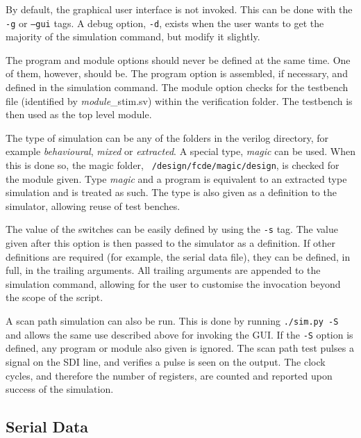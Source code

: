 By default, the graphical user interface is not invoked. 
This can be done with the \texttt{-g} or \texttt{--gui} tags. 
A debug option, \texttt{-d}, exists when the user wants to get the majority of the simulation command, but modify it slightly. 

The program and module options should never be defined at the same time. 
One of them, however, should be. 
The program option is assembled, if necessary, and defined in the simulation command. 
The module option checks for the testbench file (identified by \textit{module}\_stim.sv) within the verification folder. 
The testbench is then used as the top level module. 

The type of simulation can be any of the folders in the verilog directory, for example \textit{behavioural}, \textit{mixed} or \textit{extracted}. 
A special type, \textit{magic} can be used.
When this is done so, the magic folder, \texttt{~/design/fcde/magic/design}, is checked for the module given. 
Type \textit{magic} and a program is equivalent to an extracted type simulation and is treated as such. 
The type is also given as a definition to the simulator, allowing reuse of test benches. 

The value of the switches can be easily defined by using the \texttt{-s} tag. 
The value given after this option is then passed to the simulator as a definition. 
If other definitions are required (for example, the serial data file), they can be defined, in full, in the trailing arguments. 
All trailing arguments are appended to the simulation command, allowing for the user to customise the invocation beyond the scope of the script. 

A scan path simulation can also be run.
This is done by running \texttt{./sim.py -S} and allows the same use described above for invoking the GUI.
If the \texttt{-S} option is defined, any program or module also given is ignored.
The scan path test pulses a signal on the SDI line, and verifies a pulse is seen on the output. 
The clock cycles, and therefore the number of registers, are counted and reported upon success of the simulation.






\subsection{Serial Data}


